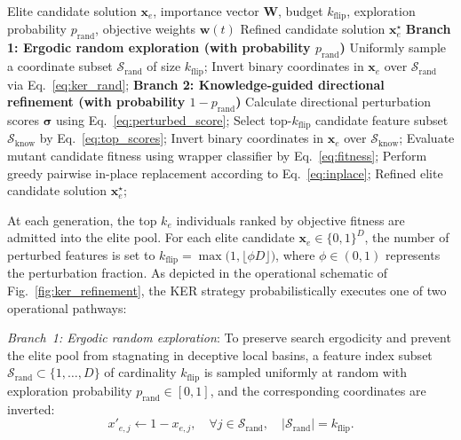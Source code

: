 \begin{algorithm}[!htb]
\small
\caption{Knowledge-guided elite refinement (KER) strategy}
\label{alg:ker}
\begin{algorithmic}[1]
\Require Elite candidate solution $\mathbf{x}_e$, importance vector $\mathbf{W}$, budget $k_{\mathrm{flip}}$, exploration probability $p_{\mathrm{rand}}$, objective weights $\mathbf{w}(t)$
\Ensure Refined candidate solution $\mathbf{x}_e^{\star}$
\State \textbf{Branch 1: Ergodic random exploration (with probability $p_{\mathrm{rand}}$)}
\State \quad Uniformly sample a coordinate subset $\mathcal{S}_{\mathrm{rand}}$ of size $k_{\mathrm{flip}}$;
\State \quad Invert binary coordinates in $\mathbf{x}_e$ over $\mathcal{S}_{\mathrm{rand}}$ via Eq.~\eqref{eq:ker_rand};
\State \textbf{Branch 2: Knowledge-guided directional refinement (with probability $1 - p_{\mathrm{rand}}$)}
\State \quad Calculate directional perturbation scores $\boldsymbol{\sigma}$ using Eq.~\eqref{eq:perturbed_score};
\State \quad Select top-$k_{\mathrm{flip}}$ candidate feature subset $\mathcal{S}_{\mathrm{know}}$ by Eq.~\eqref{eq:top_scores};
\State \quad Invert binary coordinates in $\mathbf{x}_e$ over $\mathcal{S}_{\mathrm{know}}$;
\State Evaluate mutant candidate fitness using wrapper classifier by Eq.~\eqref{eq:fitness};
\State Perform greedy pairwise in-place replacement according to Eq.~\eqref{eq:inplace};
\State \Return Refined elite candidate solution $\mathbf{x}_e^{\star}$;
\end{algorithmic}
\end{algorithm}

At each generation, the top $k_e$ individuals ranked by objective fitness are admitted into the elite pool. For each elite candidate $\mathbf{x}_e \in \{0, 1\}^D$, the number of perturbed features is set to $k_{\mathrm{flip}} = \max\bigl(1, \lfloor \phi D \rfloor\bigr)$, where $\phi \in (0, 1)$ represents the perturbation fraction. As depicted in the operational schematic of Fig.~\ref{fig:ker_refinement}, the KER strategy probabilistically executes one of two operational pathways:

\textit{Branch~1: Ergodic random exploration}: To preserve search ergodicity and prevent the elite pool from stagnating in deceptive local basins, a feature index subset $\mathcal{S}_{\mathrm{rand}} \subset \{1, \dots, D\}$ of cardinality $k_{\mathrm{flip}}$ is sampled uniformly at random with exploration probability $p_{\mathrm{rand}} \in [0, 1]$, and the corresponding coordinates are inverted:
\begin{equation}
x'_{e,j} \leftarrow 1 - x_{e,j}, \quad \forall j \in \mathcal{S}_{\mathrm{rand}}, \quad |\mathcal{S}_{\mathrm{rand}}| = k_{\mathrm{flip}}.
\label{eq:ker_rand}
\end{equation}

